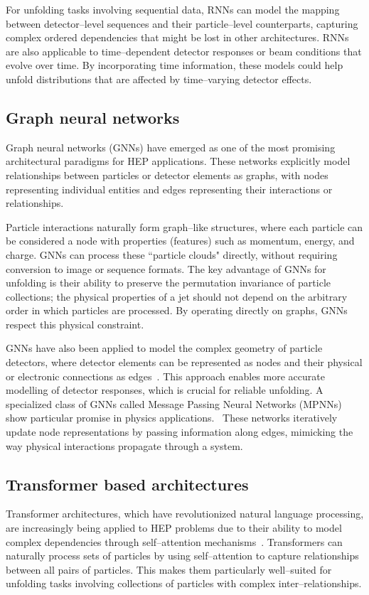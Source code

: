     For unfolding tasks involving sequential data, RNNs can model the mapping between detector--level sequences and their particle--level counterparts, capturing complex ordered dependencies that might be lost in other architectures.
    RNNs are also applicable to time--dependent detector responses or beam conditions that evolve over time.
    By incorporating time information, these models could help unfold distributions that are affected by time--varying detector effects.
\subsection{Graph neural networks}
    Graph neural networks (GNNs) have emerged as one of the most promising architectural paradigms for HEP applications.
    These networks explicitly model relationships between particles or detector elements as graphs, with nodes representing individual entities and edges representing their interactions or relationships.

    Particle interactions naturally form graph--like structures, where each particle can be considered a node with properties (features) such as momentum, energy, and charge.
    GNNs can process these ``particle clouds" directly, without requiring conversion to image or sequence formats.
    The key advantage of GNNs for unfolding is their ability to preserve the permutation invariance of particle collections;
    the physical properties of a jet should not depend on the arbitrary order in which particles are processed.
    By operating directly on graphs, GNNs respect this physical constraint.

    GNNs have also been applied to model the complex geometry of particle detectors, where detector elements can be represented as nodes and their physical or electronic connections as edges~\cite{Shlomi2020GraphPhysics, Thais2022GraphChallenges}.
    This approach enables more accurate modelling of detector responses, which is crucial for reliable unfolding.
    A specialized class of GNNs called Message Passing Neural Networks (MPNNs) show particular promise in physics applications.~\cite{Xu2024LearningTransformer}
    These networks iteratively update node representations by passing information along edges, mimicking the way physical interactions propagate through a system.
\subsection{Transformer based architectures}
    Transformer architectures, which have revolutionized natural language processing, are increasingly being applied to HEP problems due to their ability to model complex dependencies through self--attention mechanisms~\cite{Spinner2024Lorentz-EquivariantPhysics}.
    Transformers can naturally process sets of particles by using self--attention to capture relationships between all pairs of particles.
    This makes them particularly well--suited for unfolding tasks involving collections of particles with complex inter--relationships.

